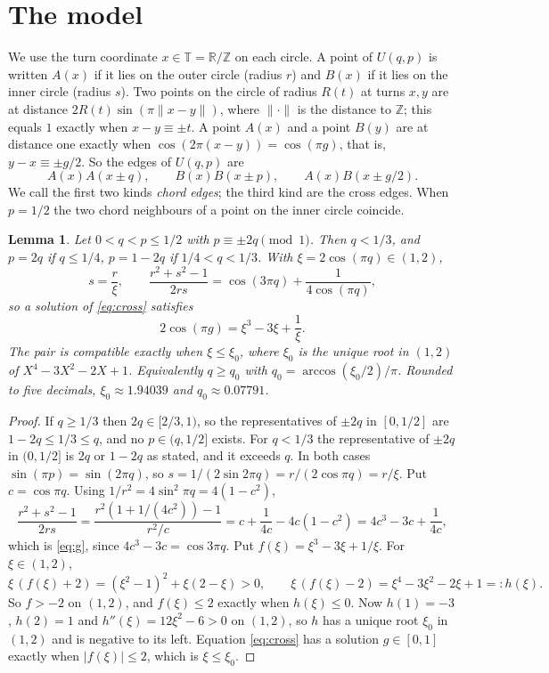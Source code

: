 \documentclass[11pt]{amsart}
\newtheorem{lemma}[theorem]{Lemma}
\theoremstyle{remark}
\numberwithin{equation}{section}
\newcommand{\T}{\mathbb{T}}
\newcommand{\Z}{\mathbb{Z}}
\begin{document}
\section{The model}\label{sec:model}

We use the turn coordinate $x\in\T=\mathbb R/\Z$ on each circle. A point
of $U(q,p)$ is written $A(x)$ if it lies on the outer circle (radius
$r$) and $B(x)$ if it lies on the inner circle (radius $s$). Two points
on the circle of radius $R(t)$ at turns $x,y$ are at distance
$2R(t)\sin(\pi\|x-y\|)$, where $\|\cdot\|$ is the distance to $\Z$; this
equals $1$ exactly when $x-y\equiv\pm t$. A point $A(x)$ and a point
$B(y)$ are at distance one exactly when $\cos(2\pi(x-y))=\cos(\pi g)$,
that is, $y-x\equiv\pm g/2$. So the edges of $U(q,p)$ are
\begin{equation}\label{eq:edges}
A(x)A(x\pm q),\qquad B(x)B(x\pm p),\qquad A(x)B(x\pm g/2).
\end{equation}
We call the first two kinds \emph{chord edges}; the third kind are the
cross edges. When $p=1/2$ the two chord neighbours of a point on the
inner circle coincide.

\begin{lemma}\label{lem:compat}
Let $0<q<p\le1/2$ with $p\equiv\pm2q\pmod1$. Then $q<1/3$, and
$p=2q$ if $q\le1/4$, $p=1-2q$ if $1/4<q<1/3$. With $\xi =2\cos(\pi q)\in(1,2)$,
\begin{equation}\label{eq:g}
s=\frac{r}{\xi},\qquad \frac{r^2+s^2-1}{2rs}=\cos(3\pi q)+\frac{1}{4\cos(\pi q)},
\end{equation}
so a solution of \eqref{eq:cross} satisfies
\[
2\cos(\pi g)=\xi^3-3\xi +\frac1\xi.
\]
The pair is compatible exactly when $\xi\le \xi_0$, where $\xi_0$ is the
unique root in $(1,2)$ of $X^4-3X^2-2X+1$. Equivalently $q\ge q_0$ with
$q_0=\arccos(\xi_0/2)/\pi$. Rounded to five decimals, $\xi_0\approx1.94039$
and $q_0\approx0.07791$.
\end{lemma}

\begin{proof}
If $q\ge1/3$ then $2q\in[2/3,1)$, so the representatives of $\pm2q$ in
$[0,1/2]$ are $1-2q\le1/3\le q$, and no $p\in(q,1/2]$ exists. For
$q<1/3$ the representative of $\pm2q$ in $(0,1/2]$ is $2q$ or $1-2q$
as stated, and it exceeds $q$. In both cases $\sin(\pi p)=\sin(2\pi q)$,
so $s=1/(2\sin2\pi q)=r/(2\cos\pi q)=r/\xi$. Put $c=\cos\pi q$. Using
$1/r^2=4\sin^2\pi q=4(1-c^2)$,
\[
\frac{r^2+s^2-1}{2rs}=\frac{r^2(1+1/(4c^2))-1}{r^2/c}
=c+\frac{1}{4c}-4c(1-c^2)=4c^3-3c+\frac1{4c},
\]
which is \eqref{eq:g}, since $4c^3-3c=\cos 3\pi q$. Put
$f(\xi)=\xi^3-3\xi +1/\xi$. For $\xi\in(1,2)$,
\[
\xi\,(f(\xi)+2)=(\xi^2-1)^2+\xi(2-\xi)>0,\qquad \xi\,(f(\xi)-2)=\xi^4-3\xi^2-2\xi +1=:h(\xi).
\]
So $f>-2$ on $(1,2)$, and $f(\xi)\le2$ exactly when $h(\xi)\le0$. Now
$h(1)=-3$, $h(2)=1$ and $h''(\xi)=12\xi^2-6>0$ on $(1,2)$, so $h$ has a
unique root $\xi_0$ in $(1,2)$ and is negative to its left. Equation
\eqref{eq:cross} has a solution $g\in[0,1]$ exactly when
$|f(\xi)|\le2$, which is $\xi\le \xi_0$.
\end{proof}
\end{document}
